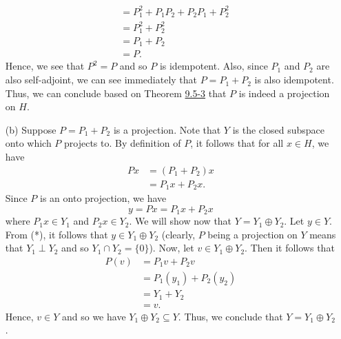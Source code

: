 \begin{enumerate}
\begin{align*}
                  &= {P}_{1}^{2} + {P}_{1} {P}_{2}  +{P}_{2} {P}_{1} + {P}_{2}^{2} \\
                  &= {P}_{1}^{2} + {P}_{2}^{2} \\
                  &= {P}_{1} + {P}_{2} \\
                  &= P.
        \end{align*}
        Hence, we see that \( P^{2} = P  \) and so \( P  \) is idempotent. Also, since \( {P}_{1} \) and \( {P}_{2}  \) are also self-adjoint, we can see immediately that \( P  = {P}_{1} + {P}_{2} \) is also idempotent. Thus, we can conclude based on Theorem {\hyperref[9.5-3]{9.5-3}} that \( P  \) is indeed a projection on \( H  \).
    \item[(b)] Suppose \( P = {P}_{1} + {P}_{2} \) is a projection. Note that \( Y  \) is the closed subspace onto which \( P  \) projects to. By definition of \( P  \), it follows that for all \( x \in  H \), we have 
        \begin{align*}
            Px &= ({P}_{1} + {P}_{2})x  \\
               &= {P}_{1}x + {P}_{2}x.
        \end{align*}
        Since \( P  \) is an onto projection, we have 
        \[  y = Px = {P}_{1}x + {P}_{2}x \tag{*} \]
        where \( {P}_{1}x \in {Y}_{1}  \) and \( {P}_{2}x \in {Y}_{2} \). We will show now that \( Y = {Y}_{1} \oplus {Y}_{2} \). Let \( y \in Y  \). From (*), it follows that \( y \in {Y}_{1} \oplus {Y}_{2} \) (clearly, \( P \) being a projection on \( Y  \) means that \( {Y}_{1} \perp {Y}_{2}  \) and so \( {Y}_{1} \cap {Y}_{2} = \{ 0  \}  \)). Now, let \( v \in {Y}_{1} \oplus {Y}_{2} \). Then it follows that 
        \begin{align*}
            P(v) &= {P}_{1}v + {P}_{2}v  \\
                 &= {P}_{1}({y}_{1}) + {P}_{2}({y}_{2}) \\
                 &= {Y}_{1} + {Y}_{2} \\
                 &= v.
        \end{align*}
        Hence, \( v \in Y  \) and so we have \( {Y}_{1} \oplus {Y}_{2} \subseteq  Y  \). Thus, we conclude that \(  Y = {Y}_{1} \oplus {Y}_{2} \).
\end{enumerate}
